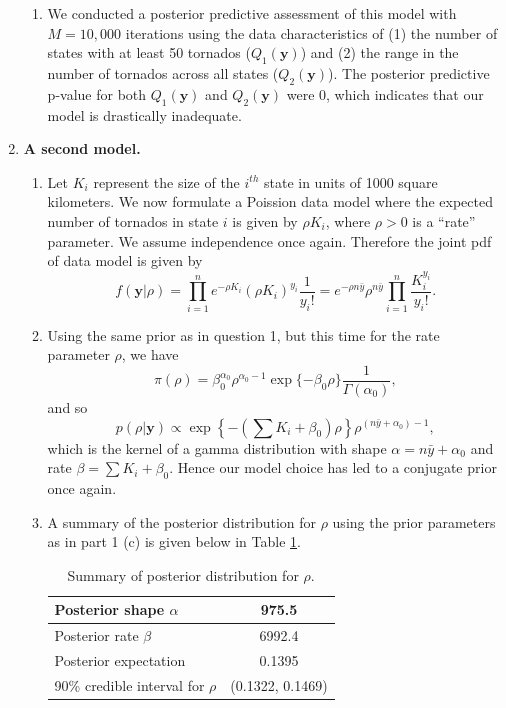 \documentclass[12pt]{article}
\begin{document}
\begin{enumerate}
\begin{enumerate}
      \item We conducted a posterior predictive assessment of this model with $M = 10,000$ iterations 
        using the data characteristics of (1) the number of states with at least 50
        tornados ($Q_1(\bm{y})$) and (2) the range in the number of tornados across all states ($Q_2(\bm{y})$). The posterior predictive p-value for
        both $Q_1(\bm{y})$ and $Q_2(\bm{y})$ were 0, which indicates that our model is drastically inadequate.

    \end{enumerate}

  \item \textbf{A second model.}
    \begin{enumerate}
      \item Let $K_i$ represent the size of the $i^{th}$ state in units of 1000 square kilometers. We now formulate a Poission data model where the 
        expected number of tornados in state $i$ is given by $\rho K_i$, where $\rho > 0$ is a ``rate'' parameter. We assume independence once again.
        Therefore the joint pdf of data model is given by 
        \[
          f(\bm{y}|\rho) = \prod_{i=1}^{n} e^{-\rho K_i}(\rho K_i)^{y_i} \frac{1}{y_i!} = e^{-\rho n\bar{y}}\rho^{n\bar{y}}
          \prod_{i=1}^{n}\frac{K_i^{y_i}}{y_i!}.
        \]

      \item Using the same prior as in question 1, but this time for the rate parameter $\rho$, we have 
        \[
          \pi(\rho) = \beta_0^{\alpha_0}\rho^{\alpha_0 - 1}\exp\{-\beta_0\rho\} \frac{1}{\Gamma(\alpha_0)},
        \]
        and so
        \[
          p(\rho|\bm{y}) \propto \exp\left\{-\left(\sum K_i + \beta_0\right)\rho\right\} \rho^{(n\bar{y} + \alpha_0) - 1},
        \]
        which is the kernel of a gamma distribution with shape $\alpha = n\bar{y} + \alpha_0$ and rate $\beta = \sum K_i + \beta_0$.
        Hence our model choice has led to a conjugate prior once again.

      \item A summary of the posterior distribution for $\rho$ using the prior parameters as in part 1 (c) is given below in Table \ref{tab:2}.

        \begin{table}[h!]
          \centering
          \begin{tabular}{lc}
            \hline
            Posterior shape $\alpha$ & 975.5 \\
            \hline
            Posterior rate $\beta$ & 6992.4  \\
            \hline
            Posterior expectation & 0.1395 \\
            \hline
            90\% credible interval for $\rho$ & (0.1322, 0.1469) \\
            \hline
          \end{tabular}
          \caption{Summary of posterior distribution for $\rho$.}
          \label{tab:2}
        \end{table}


\end{enumerate}
\end{enumerate}
\end{document}
